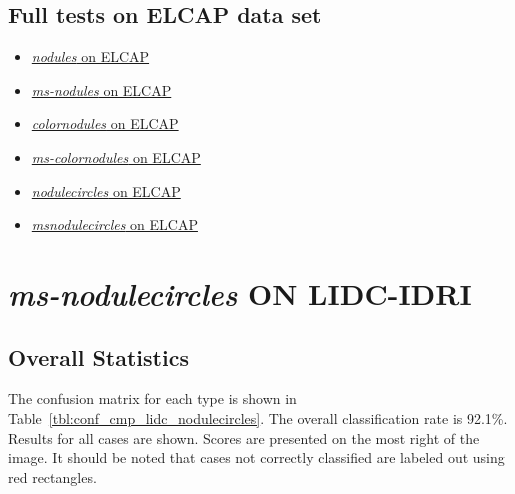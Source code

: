 \documentclass[onecolumn]{IEEEtran}
\begin{document}
\subsection{Full tests on ELCAP data set}
\begin{itemize}
\item \href{http://liu3xing3long.github.io/}{\emph{nodules} on ELCAP}

\item \href{http://liu3xing3long.github.io/}{\emph{ms-nodules} on ELCAP}

\item \href{http://liu3xing3long.github.io/}{\emph{colornodules} on ELCAP}

\item \href{http://liu3xing3long.github.io/}{\emph{ms-colornodules} on ELCAP}

\item \href{http://liu3xing3long.github.io/}{\emph{nodulecircles} on ELCAP}

\item \href{http://liu3xing3long.github.io/}{\emph{msnodulecircles} on ELCAP}

\end{itemize}


\newpage
\section{\emph{ms-nodulecircles} ON LIDC-IDRI}
\subsection{Overall Statistics }
The confusion matrix for each type is shown in Table~\ref{tbl:conf_cmp_lidc_nodulecircles}. The overall classification rate is 92.1\%. Results for all cases are shown. Scores are presented on the most right of the image. It should be noted that cases not correctly classified are labeled out using red rectangles.
\end{document}
